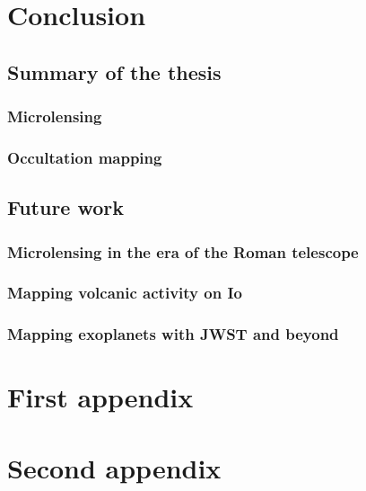 \documentclass[]{report}
\begin{document}
\chapter{Conclusion}
\section{Summary of the thesis}
\subsection{Microlensing}
\subsection{Occultation mapping}
\section{Future work}
\subsection{Microlensing in the era of the Roman telescope}
\subsection{Mapping volcanic activity on Io}
\subsection{Mapping exoplanets with JWST and beyond}

\appendix

\chapter{First appendix}
\chapter{Second appendix}
\end{document}
